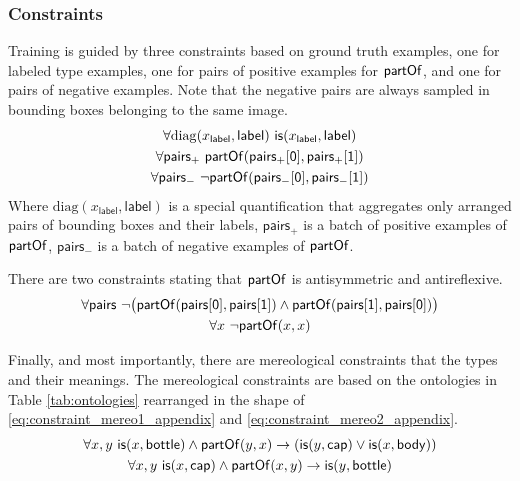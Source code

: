 \subsubsection{Constraints}
Training is guided by three constraints based on ground truth examples,
one for labeled type examples, one for pairs of positive examples for $\mathsf{partOf}$, and one for pairs of negative examples. 
Note that the negative pairs are always sampled in bounding boxes belonging to the same image.
\begin{gather}
    \forall \mathrm{diag}(x_\mathsf{label}, \mathsf{label})\ \istype(x_\mathsf{label}, \mathsf{label}) \\
    \forall \mathsf{pairs_+}\ \ispartof(\mathsf{pairs_+[0]}, \mathsf{pairs_+[1]}) \\
    \forall \mathsf{pairs_-}\ \lnot \ispartof(\mathsf{pairs_-[0]}, \mathsf{pairs_-[1]}) \\
\end{gather}
Where $\mathrm{diag}(x_\mathsf{label}, \mathsf{label})$ is a special quantification that aggregates only arranged pairs of bounding boxes and their labels,
$\mathsf{pairs_+}$ is a batch of positive examples of $\mathsf{partOf}$, $\mathsf{pairs_-}$ is a batch of negative examples of $\mathsf{partOf}$.

There are two constraints stating that $\mathsf{partOf}$ is antisymmetric and antireflexive.
\begin{gather}
    \forall \mathsf{pairs}\ \lnot \big( \mathsf{partOf}(\mathsf{pairs[0]}, \mathsf{pairs[1]}) \land \mathsf{partOf}(\mathsf{pairs[1]}, \mathsf{pairs[0]}) \big) \\
    \forall x\ \lnot \mathsf{partOf}(x, x)
\end{gather}

Finally, and most importantly, there are mereological constraints that the types and their meanings.
The mereological constraints are based on the ontologies in Table \ref{tab:ontologies} rearranged in the shape of \eqref{eq:constraint_mereo1_appendix} and \eqref{eq:constraint_mereo2_appendix}.
\begin{gather}
    \forall x,y \ \mathsf{is}(x,\mathsf{bottle}) \land \mathsf{partOf}(y,x) \rightarrow (\mathsf{is}(y,\mathsf{cap}) \lor \mathsf{is}(x,\mathsf{body})) \label{eq:constraint_mereo1_appendix} \\
    \forall x,y \ \mathsf{is}(x,\mathsf{cap}) \land \mathsf{partOf}(x,y) \rightarrow \mathsf{is}(y,\mathsf{bottle}) \label{eq:constraint_mereo2_appendix} 
\end{gather}

